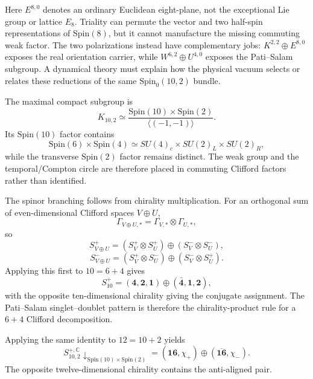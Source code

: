 \documentclass[11pt]{article}
\theoremstyle{definition}\newtheorem{definition}[theorem]{Definition}
\theoremstyle{remark}\newtheorem{remark}[theorem]{Remark}\newtheorem{conjecture}[theorem]{Conjecture}
\begin{document}
Here $E^{8,0}$ denotes an ordinary Euclidean eight-plane, not the exceptional Lie group or lattice $E_8$. Triality can permute the vector and two half-spin representations of $\mathrm{Spin}(8)$, but it cannot manufacture the missing commuting weak factor. The two polarizations instead have complementary jobs: $K^{2,2}\oplus E^{8,0}$ exposes the real orientation carrier, while $W^{6,2}\oplus U^{4,0}$ exposes the Pati--Salam subgroup. A dynamical theory must explain how the physical vacuum selects or relates these reductions of the same $\mathrm{Spin}_0(10,2)$ bundle.

The maximal compact subgroup is
\begin{equation}\label{eq:K102}
 \boxed{
 K_{10,2}\simeq
 \frac{\mathrm{Spin}(10)\times\mathrm{Spin}(2)}
 {\langle(-1,-1)\rangle}.}
\end{equation}
Its $\mathrm{Spin}(10)$ factor contains
\begin{equation}\label{eq:spin10PSsubgroup}
 \mathrm{Spin}(6)\times\mathrm{Spin}(4)
 \simeq SU(4)_c\times SU(2)_L\times SU(2)_R,
\end{equation}
while the transverse $\mathrm{Spin}(2)$ factor remains distinct. The weak group and the temporal/Compton circle are therefore placed in commuting Clifford factors rather than identified.

The spinor branching follows from chirality multiplication. For an orthogonal sum of even-dimensional Clifford spaces $V\oplus U$,
\begin{equation}\label{eq:chiralityproduct}
 \Gamma_{V\oplus U,*}=\Gamma_{V,*}\otimes\Gamma_{U,*},
\end{equation}
so
\begin{equation}
 S^+_{V\oplus U}=(S_V^+\otimes S_U^+)\oplus(S_V^-\otimes S_U^-),
\end{equation}
\begin{equation}
 S^-_{V\oplus U}=(S_V^+\otimes S_U^-)\oplus(S_V^-\otimes S_U^+).
\end{equation}
Applying this first to $10=6+4$ gives
\begin{equation}\label{eq:spin10PSbranch}
 \boxed{S_{10}^+=(\mathbf4,\mathbf2,\mathbf1)\oplus(\bar{\mathbf4},\mathbf1,\mathbf2),}
\end{equation}
with the opposite ten-dimensional chirality giving the conjugate assignment. The Pati--Salam singlet--doublet pattern is therefore the chirality-product rule for a $6+4$ Clifford decomposition.

Applying the same identity to $12=10+2$ yields
\begin{equation}\label{eq:spin102branch}
 \boxed{
 S_{10,2}^{+,\mathbb C}\downarrow_{\mathrm{Spin}(10)\times\mathrm{Spin}(2)}
 =(\mathbf{16},\chi_+)\oplus(\overline{\mathbf{16}},\chi_-).}
\end{equation}
The opposite twelve-dimensional chirality contains the anti-aligned pair.
\end{document}
